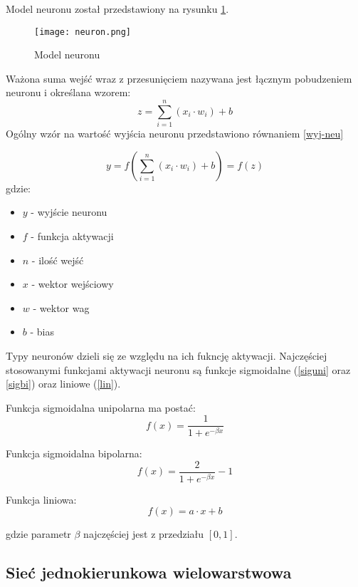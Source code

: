 \documentclass[12pt,twoside]{article}
\begin{document}
Model neuronu został przedstawiony na rysunku \ref{neuron}.

\begin{figure}[ht]
\label{neuron}
\centering
\texttt{[image: neuron.png]}
\caption{Model neuronu}
\end{figure}
\clearpage
Ważona suma wejść wraz z przesunięciem nazywana jest łącznym pobudzeniem neuronu i określana wzorem:
\begin{equation}\label{pobudzenie}
z = \sum_{i=1}^{n}(x_i \cdot w_i) + b 
\end{equation}
Ogólny wzór na wartość wyjścia neuronu przedstawiono równaniem \ref{wyj-neu}

\begin{equation}\label{wyj-neu}
y = f \left(  \sum_{i=1}^{n}(x_i \cdot w_i) + b \right) = f(z)
\end{equation}
gdzie:
\begin{itemize}
\item $y$ - wyjście neuronu
\item $f$ - funkcja aktywacji
\item $n$ - ilość wejść
\item $x$ - wektor wejściowy
\item $w$ - wektor wag
\item $b$  - bias
\end{itemize}
Typy neuronów dzieli się ze względu na ich fukncję aktywacji. Najczęściej stosowanymi funkcjami aktywacji neuronu są funkcje sigmoidalne (\ref{siguni} oraz \ref{sigbi}) oraz liniowe (\ref{lin}).

Funkcja sigmoidalna unipolarna ma postać:
\begin{equation}\label{siguni}
f(x) = \frac{1}{1 + e^{-\beta x}}
\end{equation}

Funkcja sigmoidalna bipolarna:
\begin{equation}\label{sigbi}
f(x) = \frac{2}{1 + e^{-\beta x}} -1
\end{equation}

Funkcja liniowa:
\begin{equation}\label{lin}
f(x) = a \cdot x + b
\end{equation}

gdzie parametr $\beta$ najczęściej jest z przedziału $[0, 1]$.
\clearpage

\subsection{Sieć jednokierunkowa wielowarstwowa}
\end{document}
